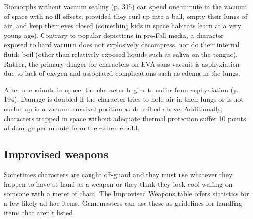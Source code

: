 Biomorphs without vacuum sealing (p. 305) can spend one minute in the vacuum of space with no ill effects, provided they curl up into a ball, empty their lungs of air, and keep their eyes closed (something kids in space habitats learn at a very young age). Contrary to popular depictions in pre-Fall media, a character exposed to hard vacuum does not explosively decompress, nor do their internal fluids boil (other than relatively exposed liquids such as saliva on the tongue). Rather, the primary danger for characters on EVA sans vacsuit is asphyxiation due to lack of oxygen and associated complications such as edema in the lungs. 

After one minute in space, the character begins to suffer from asphyxiation (p. 194). Damage is doubled if the character tries to hold air in their lungs or is not curled up in a vacuum survival position as described above. Additionally, characters trapped in space without adequate thermal protection suffer 10 points of damage per minute from the extreme cold. 

\subsection{Improvised weapons} \label{sec:improvised-weapons} 

Sometimes characters are caught off-guard and they must use whatever they happen to have at hand as a weapon-or they think they look cool wailing on someone with a meter of chain. The Improvised Weapons table offers statistics for a few likely ad-hoc items. Gamemasters can use these as guidelines for handling items that aren’t listed. 

